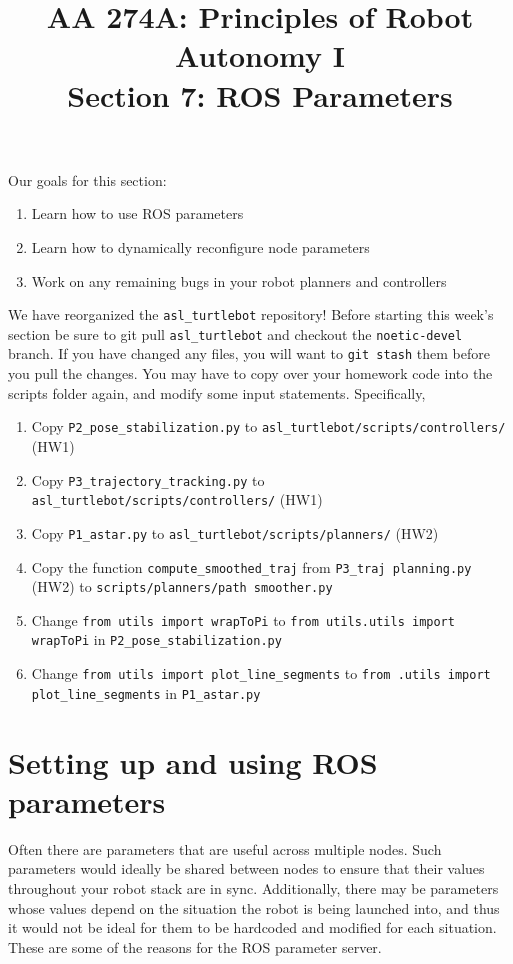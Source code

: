 \documentclass{article}
\title{AA 274A: Principles of Robot Autonomy I \\ Section 7: ROS Parameters}
\date{}
\begin{document}
\maketitle
\pagestyle{fancy}

Our goals for this section: \begin{enumerate}
	\item Learn how to use ROS parameters
    \item Learn how to dynamically reconfigure node parameters
    \item Work on any remaining bugs in your robot planners and controllers
\end{enumerate}
We have reorganized the \texttt{asl\_turtlebot} repository! Before starting this week's section be sure to git pull \texttt{asl\_turtlebot} and checkout the \texttt{noetic-devel} branch. If you have changed any files, you will want to \texttt{git stash} them before you pull the changes. You may have to copy over your homework code into the scripts folder again, and modify some input statements. Specifically,
\begin{enumerate}
    \item Copy \texttt{P2\_pose\_stabilization.py} to \texttt{asl\_turtlebot/scripts/controllers/} (HW1)
    \item Copy \texttt{P3\_trajectory\_tracking.py} to \texttt{asl\_turtlebot/scripts/controllers/} (HW1)
    \item Copy \texttt{P1\_astar.py} to \texttt{asl\_turtlebot/scripts/planners/} (HW2)
    \item Copy the function \texttt{compute\_smoothed\_traj} from \texttt{P3\_traj planning.py} (HW2) to \texttt{scripts/planners/path smoother.py}
    \item Change \texttt{from utils import wrapToPi} to \texttt{from utils.utils import wrapToPi} in \texttt{P2\_pose\_stabilization.py}
    \item Change \texttt{from utils import plot\_line\_segments} to \texttt{from .utils import plot\_line\_segments} in \texttt{P1\_astar.py}
\end{enumerate}

\section{Setting up and using ROS parameters}
Often there are parameters that are useful across multiple nodes. Such parameters would ideally be shared between nodes to ensure that their values throughout your robot stack are in sync. Additionally, there may be parameters whose values depend on the situation the robot is being launched into, and thus it would not be ideal for them to be hardcoded and modified for each situation. These are some of the reasons for the ROS parameter server.
\end{document}
